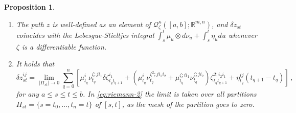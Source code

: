 \documentclass[12pt,reqno]{amsart}
\numberwithin{equation}{section}  %
\newcommand{\der}{\delta}
\newcommand{\1}{{\bf 1}}
\newcommand{\2}{{\bf 2}}
\newcommand{\bzeta}{{\zeta}}
\newcommand{\R}{\mathbb R}
\newcommand{\cac}{\mathcal C}
\newcommand{\cn}{\mathcal N}
\newcommand{\cq}{\mathcal Q}
\newcommand{\al}{\alpha}
\newcommand{\ka}{\kappa}
\newcommand{\lp}{\left(}
\newcommand{\rp}{\right)}
\newcommand{\lc}{\left[}
\newcommand{\rc}{\right]}
\newcommand{\lcl}{\left\{}
\newcommand{\rcl}{\right\}}
\newtheorem{proposition}[theorem]{Proposition}
\theoremstyle{remark}
\theoremstyle{remark}
\begin{document}
\begin{proposition}
\begin{enumerate}[wide, labelwidth=!, labelindent=0pt, label=\textnormal{(\arabic*)}]
\item 
The path $z$ is well-defined as an element of $\cq_{\zeta}^{\ka}([a,b]; \R^{m,n})$, and $\der z_{st}$ coincides with the Lebesgue-Stieltjes integral $\int_s^t \mu_u \otimes d\nu_u + \int_s^t \eta_u du$  whenever $\zeta$ is a differentiable function.


\item It holds that 
\begin{equation}\label{eq:riemann-2}
\der z_{st}^{ij} = \lim_{|\Pi_{st}| \to 0} \sum_{q=0}^n \lc \mu_{t_q}^i  \nu_{t_q}^{\bzeta;j i_1} \der \bzeta_{t_q t_{q+1}}^{i_1} 
+ \lp \mu_{t_q}^i \nu_{t_q}^{\bzeta^2;j i_1 i_2} 
+ \mu_{t_q}^{\bzeta; i i_1} \nu_{t_q}^{\bzeta; j i_2} \rp \bzeta_{t_q t_{q+1}}^{2; i_2 i_1} +\eta_{t_q}^{ij} (t_{q+1} - t_q) \rc \, ,
\end{equation}
for any $a \leq s \leq t \leq b$. In \eqref{eq:riemann-2} the limit is taken over all partitions $\Pi_{st} = \{s=t_0, \ldots, t_n=t\}$ of $[s,t]$, as the mesh of the partition goes to zero. 
\end{enumerate}
\end{proposition}
\end{document}
